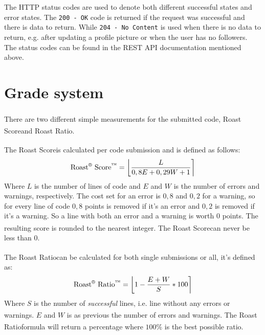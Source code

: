 \documentclass[12pt,a4paper]{report}
\begin{document}
The HTTP status codes are used to denote both different successful states and error states. The \texttt{200 - OK} code is returned if the request was successful and there is data to return. While \texttt{204 - No Content} is used when there is no data to return, e.g. after updating a profile picture or when the user has no followers. The status codes can be found in the REST API documentation mentioned above.

\newcommand{\rratio}{Roast\textsuperscript{\textregistered} Ratio\textsuperscript{\texttrademark}}
\newcommand{\rscore}{Roast\textsuperscript{\textregistered} Score\textsuperscript{\texttrademark}}

\section{Grade system}
There are two different simple measurements for the submitted code, \rscore and \rratio.

The \rscore is calculated per code submission and is defined as follows:
\begin{equation*}
    \text{\rscore} = \left\lfloor\frac{L}{0,8E + 0,29W + 1}\right\rceil
\end{equation*}
Where $L$ is the number of lines of code and $E$ and $W$ is the number of errors and warnings, respectively. The cost set for an error is $0,8$ and $0,2$ for a warning, so for every line of code $0,8$ points is removed if it's an error and $0,2$ is removed if it's a warning. So a line with both an error and a warning is worth $0$ points. The resulting score is rounded to the nearest integer. The \rscore can never be less than $0$.

The \rratio can be calculated for both single submissions or all, it's defined as:
\begin{equation*}
    \text{\rratio} = \left\lfloor 1 - \frac{E + W}{S} * 100 \right\rceil
\end{equation*}
Where $S$ is the number of \textit{successful} lines, i.e. line without any errors or warnings. $E$ and $W$ is as previous the number of errors and warnings. The \rratio formula will return a percentage where $100 \%$ is the best possible ratio.

\end{document}
